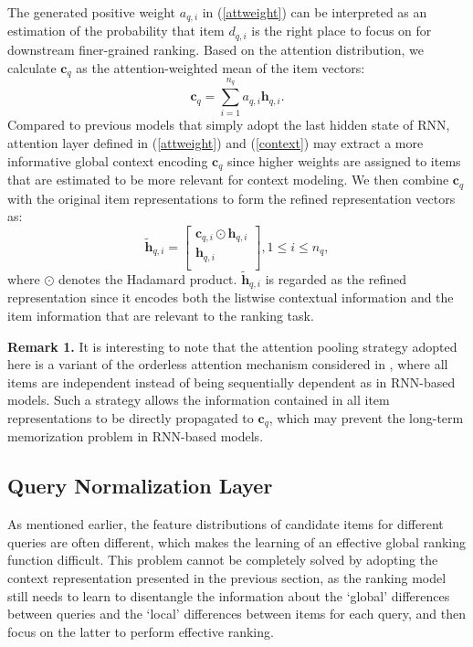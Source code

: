 \documentclass[letterpaper]{article} %
\begin{document}
The generated positive weight ${{a}_{q,i}}$ in (\ref{attweight}) can be interpreted as an estimation of the probability that item ${{d}_{q,i}}$ is the right place to focus on for downstream finer-grained ranking. Based on the attention distribution, we calculate ${{\mathbf{c}}_{q}}$ as the attention-weighted mean of the item vectors:
\begin{equation}
\label{context}
{{\mathbf{c}}_{q}}=\sum\limits_{i=1}^{{{n}_{q}}}{{{a}_{q,i}}{{\mathbf{h}}_{q,i}}}.
\end{equation}
Compared to previous models that simply adopt the last hidden state of RNN, attention layer defined in (\ref{attweight}) and (\ref{context}) may extract a more informative global context encoding ${{\mathbf{c}}_{q}}$ since higher weights are assigned to items that are estimated to be more relevant for context modeling. We then combine ${{\mathbf{c}}_{q}}$ with the original item representations to form the refined representation vectors as:
\begin{equation}
\label{latentcross}
{{\widetilde{\mathbf{h}}}_{q,i}}=\left[ \begin{matrix}
{\mathbf{c}_{q,i}}\odot{{\mathbf{h}}_{q,i}}  \\
{{\mathbf{h}}_{q,i}}  \\
\end{matrix} \right],1\le i\le {{n}_{q}},
\end{equation}
where $\odot$ denotes the Hadamard product. ${{\widetilde{\mathbf{h}}}_{q,i}}$ is regarded as the refined representation since it encodes both the listwise contextual information and the item information that are relevant to the ranking task.

\noindent \textbf{Remark 1.} It is interesting to note that the attention pooling strategy adopted here is a variant of the orderless attention mechanism considered in \cite{OrderlessAttention,lin2017structured}, where all items are independent instead of being sequentially dependent as in RNN-based models. Such a strategy allows the information contained in all item representations to be directly propagated to ${{\mathbf{c}}_{q}}$, which may prevent the long-term memorization problem in RNN-based models.

\subsection{Query Normalization Layer}

As mentioned earlier, the feature distributions of candidate items for different queries are often different, which makes the learning of an effective global ranking function difficult. This problem cannot be completely solved by adopting the context representation presented in the previous section, as the ranking model still needs to learn to disentangle the information about the `global' differences between queries and the `local' differences between items for each query, and then focus on the latter to perform effective ranking.
\end{document}
